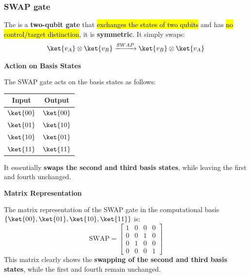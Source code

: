 \subsubsection{SWAP gate}\label{sec:swap-gate}

The  is a \textbf{two-qubit gate} that \hl{exchanges the states of two qubits} and has \hl{no control/target distinction}, it is \textbf{symmetric}. It simply swaps:
\begin{equation}\label{eq:swap}
    \ket{v_{A}} \otimes \ket{v_{B}} \xrightarrow{SWAP} \ket{v_{B}} \otimes \ket{v_{A}}
\end{equation}

\highspace
\begin{flushleft}
    \textcolor{Green3}{ \textbf{Action on Basis States}}
\end{flushleft}
The SWAP gate acts on the basis states as follows:

\begin{table}[!htp]
    \centering
    \begin{tabular}{@{} c | c @{}}
        \toprule
        \textbf{Input} & \textbf{Output} \\
        \midrule
        $\ket{00}$ & $\ket{00}$ \\
        $\ket{01}$ & $\ket{10}$ \\
        $\ket{10}$ & $\ket{01}$ \\
        $\ket{11}$ & $\ket{11}$ \\
        \bottomrule
    \end{tabular}
\end{table}

\noindent
It essentially \textbf{swaps the second and third basis states}, while leaving the first and fourth unchanged.

\highspace
\begin{flushleft}
    \textcolor{Green3}{ \textbf{Matrix Representation}}
\end{flushleft}
The matrix representation of the SWAP gate in the computational basis $\{\ket{00},\break \ket{01}, \ket{10}, \ket{11}\}$ is:
\begin{equation}
    \text{SWAP} = \begin{bmatrix}
        1 & 0 & 0 & 0 \\
        0 & 0 & 1 & 0 \\
        0 & 1 & 0 & 0 \\
        0 & 0 & 0 & 1
    \end{bmatrix}
\end{equation}
This matrix clearly shows the \textbf{swapping of the second and third basis states}, while the first and fourth remain unchanged.

